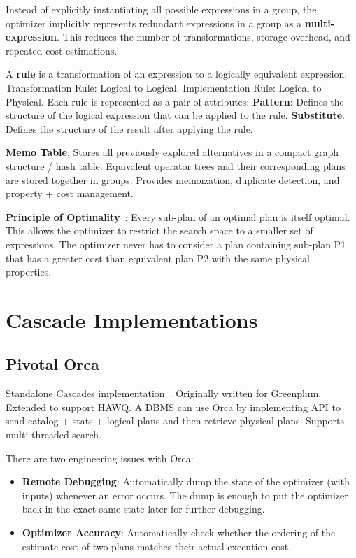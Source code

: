 \documentclass[11pt]{article}
\begin{document}
Instead of explicitly instantiating all possible expressions in a group, the optimizer implicitly represents redundant expressions in a group as a \textbf{multi-expression}. This reduces the number of transformations, storage overhead, and repeated cost estimations.

A \textbf{rule} is a transformation of an expression to a logically equivalent expression. Transformation Rule: Logical to Logical. Implementation Rule: Logical to Physical. Each rule is represented as a pair of attributes: \textbf{Pattern}: Defines the structure of the logical expression that can be applied to the rule. \textbf{Substitute}: Defines the structure of the result after applying the rule.

\textbf{Memo Table}: Stores all previously explored alternatives in a compact graph structure / hash table. Equivalent operator trees and their corresponding plans are stored together in groups. Provides memoization, duplicate detection, and property + cost management.

\textbf{Principle of Optimality}~\cite{Shapiro2001}: Every sub-plan of an optimal plan is itself optimal. This allows the optimizer to restrict the search space to a smaller set of expressions. The optimizer never has to consider a plan containing sub-plan P1 that has a greater cost than equivalent plan P2 with the same physical properties.



\section{Cascade Implementations}

\subsection*{Pivotal Orca}
Standalone Cascades implementation~\cite{Soliman2014}. Originally written for Greenplum. Extended to support HAWQ. A DBMS can use Orca by implementing API to send catalog + stats + logical plans and then retrieve physical plans. Supports multi-threaded search.

There are two engineering issues with Orca:
\begin{itemize}
	\item \textbf{Remote Debugging}:
	Automatically dump the state of the optimizer (with inputs) whenever an error occurs.
	The dump is enough to put the optimizer back in the exact same state later for further debugging.
	
	\item \textbf{Optimizer Accuracy}:
	Automatically check whether the ordering of the estimate cost of two plans matches their actual execution cost.
\end{itemize}
\end{document}
